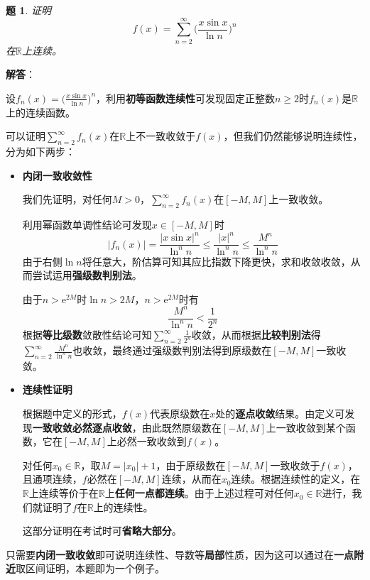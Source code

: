 \documentclass[a4paper,UTF8,fontset=windows,AutoFakeBold]{ctexart}
\newcommand*{\er}{\mathrm{e}}
\newcommand*{\rb}{\mathbb{R}}
\newcommand*{\suminf}[1][n=1]{\sum_{#1}^\infty}
\newcommand*{\note}{\noindent *}
\theoremstyle{ex}
\newtheorem{exercise}{题}
\newcommand{\sol}[1]{{\vspace{5pt}\kaishu\noindent\textbf{解答}：\vspace{-3pt}
\begin{compactitem}
    \item[] #1
\end{compactitem}
}}
\begin{document}
\begin{framed}
\begin{exercise}
    证明
    $$f(x)=\suminf[n=2]\bigg(\frac{x\sin x}{\ln n}\bigg)^n$$
    在$\rb$上连续。
\end{exercise}
\sol{
    设$f_n(x)=\big(\frac{x\sin x}{\ln n}\big)^n$，利用\textbf{初等函数连续性}可发现固定正整数$n\ge2$时$f_n(x)$是$\rb$上的连续函数。

    可以证明$\suminf[n=2]f_n(x)$在$\rb$上不一致收敛于$f(x)$，但我们仍然能够说明连续性，分为如下两步：
    \begin{itemize}
        \item \textbf{内闭一致收敛性}
        
        我们先证明，对任何$M>0$，$\suminf[n=2]f_n(x)$在$[-M,M]$上一致收敛。

        利用幂函数单调性结论可发现$x\in[-M,M]$时
        $$|f_n(x)|=\frac{|x\sin x|^n}{\ln^nn}\le\frac{|x|^n}{\ln^nn}\le\frac{M^n}{\ln^nn}$$
        由于右侧$\ln n$将任意大，阶估算可知其应比指数下降更快，求和收敛收敛，从而尝试运用\textbf{强级数判别法}。

        由于$n>\er^{2M}$时$\ln n>2M$，$n>\er^{2M}$时有
        $$\frac{M^n}{\ln^nn}<\frac{1}{2^n}$$
        根据\textbf{等比级数}敛散性结论可知$\suminf[n=2]\frac{1}{2^n}$收敛，从而根据\textbf{比较判别法}得$\suminf[n=2]\frac{M^n}{\ln^nn}$也收敛，最终通过强级数判别法得到原级数在$[-M,M]$一致收敛。

        \item \textbf{连续性证明}
        
        根据题中定义的形式，$f(x)$代表原级数在$x$处的\textbf{逐点收敛}结果。由定义可发现\textbf{一致收敛必然逐点收敛}，由此既然原级数在$[-M,M]$上一致收敛到某个函数，它在$[-M,M]$上必然一致收敛到$f(x)$。

        对任何$x_0\in\rb$，取$M=|x_0|+1$，由于原级数在$[-M,M]$一致收敛于$f(x)$，且通项连续，$f$必然在$[-M,M]$连续，从而在$x_0$连续。根据连续性的定义，在$\rb$上连续等价于在$\rb$上\textbf{任何一点都连续}。由于上述过程可对任何$x_0\in\rb$进行，我们就证明了$f$在$\rb$上的连续性。

        \note 这部分证明在考试时可\textbf{省略大部分}。
    \end{itemize}
}
\end{framed}

\note 只需要\textbf{内闭一致收敛}即可说明连续性、导数等\textbf{局部}性质，因为这可以通过在\textbf{一点附近}取区间证明，本题即为一个例子。
\end{document}
